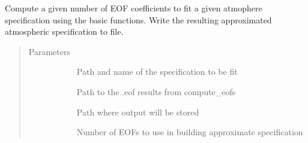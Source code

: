 \documentclass[letterpaper,10pt,english]{sphinxmanual}
\begin{document}
\begin{fulllineitems}
\label{\detokenize{stochprop.eofs:stochprop.eofs.fit_atmo}}
\sphinxAtStartPar
Compute a given number of EOF coefficients to fit a given
atmophere specification using the basic functions.  Write
the resulting approximated atmospheric specification to
file.
\begin{quote}\begin{description}
\item[{Parameters}] \leavevmode\begin{description}
\item[{}] \leavevmode
\sphinxAtStartPar
Path and name of the specification to be fit

\item[{}] \leavevmode
\sphinxAtStartPar
Path to the .eof results from compute\_eofs

\item[{}] \leavevmode
\sphinxAtStartPar
Path where output will be stored

\item[{}] \leavevmode
\sphinxAtStartPar
Number of EOFs to use in building approximate specification

\end{description}

\end{description}\end{quote}

\end{fulllineitems}

\end{document}
